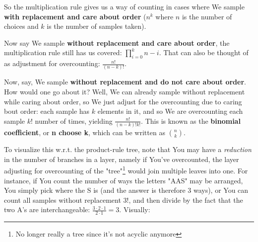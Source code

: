 \documentclass{article}
\begin{document}
			So the multiplication rule gives us a way of counting in cases where We sample \textbf{with replacement and care about order} ($n^k$ where $n$ is the number of choices and $k$ is the number of samples taken).
			
			Now say We sample \textbf{without replacement and care about order}, the multiplication rule still has us covered: $\prod_{i=0}^k n - i$. That can also be thought of as adjustment for overcounting: $\frac{n!}{(n-k)!}$.
			
			Now, say, We sample \textbf{without replacement and do not care about order}. How would one go about it? Well, We can already sample without replacement while caring about order, so We just adjust for the overcounting due to caring bout order: each sample has $k$ elements in it, and so We are overcounting each sample $k!$ number of times, yielding $\frac{n!}{(n-k)!k!}$. This is known as the \textbf{binomial coefficient}, or \textbf{n choose k}, which can be written as $\binom{n}{k}$.
		
			To visualize this w.r.t. the product-rule tree, note that You may have a \textit{reduction} in the number of branches in a layer, namely if You've overcounted, the layer adjusting for overcounting of the "tree"\footnote{No longer really a tree since it's not acyclic anymore} would join multiple leaves into one. For instance, if You count the number of ways the letters "AAS" may be arranged, You simply pick where the S is (and the answer is therefore 3 ways), or You can count all samples without replacement $3!$, and then divide by the fact that the two A's are interchangeable: $\frac{3\cdot 2 \cdot 1}{2 \cdot 1} = 3$. Visually:
		
\end{document}
